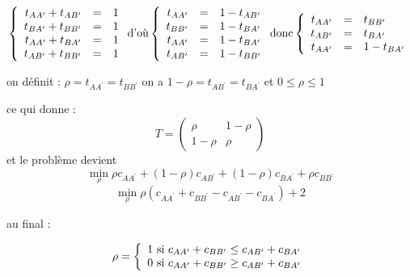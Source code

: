 \begin{equation}
\left \{
\begin{array}{r c l}
  t_{AA^\prime} + t_{AB^\prime}  & = & 1 \\
  t_{BA^\prime} + t_{BB^\prime}  & = & 1 \\
  t_{AA^\prime} + t_{BA^\prime}  & = & 1 \\
  t_{AB^\prime} + t_{BB^\prime}  & = & 1 \\
\end{array}
\right .
\text{d'où}
\left \{
\begin{array}{r c l}
  t_{AA^\prime}  & = & 1 - t_{AB^\prime}\\
  t_{BB^\prime}  & = & 1 - t_{BA^\prime}\\
  t_{AA^\prime}  & = & 1 - t_{BA^\prime}\\
  t_{AB^\prime}  & = & 1 - t_{BB^\prime}\\
\end{array}
\right .
\text{donc}
\left \{
\begin{array}{r c l}
  t_{AA^\prime}  & = & t_{BB^\prime}\\
  t_{AB^\prime}  & = & t_{BA^\prime}\\
  t_{AA^\prime}  & = & 1 - t_{BA^\prime}\\
\end{array}
\right .
\end{equation}

on définit : $\rho = t_{AA^\prime} = t_{BB^\prime}$ on a $1-\rho = t_{AB^\prime} = t_{BA^\prime}$ et $0\leq \rho\leq 1$

ce qui donne :
$$
T = 
\begin{pmatrix}
   \rho & 1-\rho \\
   1- \rho & \rho
\end{pmatrix}
$$
et le problème devient
\begin{equation}
\min_\rho \rho c_{AA^\prime} + (1- \rho) c_{AB^\prime} + (1-\rho) c_{BA^\prime} + \rho c_{BB^\prime}
\end{equation}
\begin{equation}
\min_\rho \rho (c_{AA^\prime} + c_{BB^\prime} - c_{AB^\prime} - c_{BA^\prime}) + 2
\end{equation}

au final :

\begin{equation}
\rho = \left \{
\begin{array}{r c l}
	1\ \text{si}\ c_{AA^\prime} + c_{BB^\prime} \leq c_{AB^\prime} + c_{BA^\prime} \\
	0\ \text{si}\ c_{AA^\prime} + c_{BB^\prime} \geq c_{AB^\prime} + c_{BA^\prime} \\
\end{array}
\right .
\end{equation}


